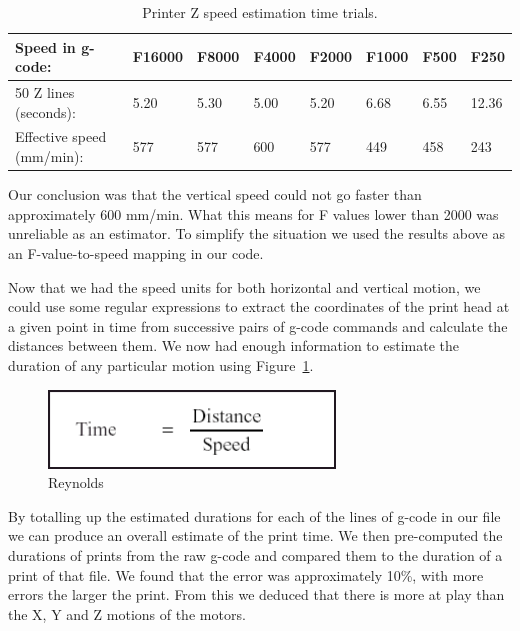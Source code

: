 \documentclass[pdftex, 11pt]{report} %
\begin{document}
\begin{table}[h]{\begin{minipage}{\textwidth}
\begin{tabular}{| l || l | l | l | l | l | l | l |}
\hline
Speed in g-code: & F16000 & F8000 & F4000 & F2000 & F1000 & F500 & F250 \\\hline
50 Z lines (seconds): & 5.20 & 5.30 & 5.00 & 5.20 & 6.68 & 6.55 & 12.36 \\\hline
Effective speed (mm/min): & 577 & 577 & 600 & 577 & 449 & 458 & 243 \\\hline

\end{tabular}
\caption{Printer Z speed estimation time trials.}
\label{table:speedTimes}
\end{minipage} }
\end{table}

Our conclusion was that the vertical speed could not go faster than approximately 600 mm/min. What this means for F values lower than 2000 was unreliable as an estimator. To simplify the situation we used the results above as an F-value-to-speed mapping in our code.

Now that we had the speed units for both horizontal and vertical motion, we could use some regular expressions to extract the coordinates of the print head at a given point in time from successive pairs of g-code commands and calculate the distances between them. We now had enough information to estimate the duration of any particular motion using Figure~\ref{figure:TDS}.

\begin{figure}[H]
  \centering
  \includegraphics[width=3in]{TDS.png}
  \caption{Reynolds~\cite{Reynolds2008}}
  \label{figure:TDS}
\end{figure}

By totalling up the estimated durations for each of the lines of g-code in our file we can produce an overall estimate of the print time. We then pre-computed the durations of prints from the raw g-code and compared them to the duration of a print of that file. We found that the error was approximately 10\%, with more errors the larger the print. From this we deduced that there is more at play than the X, Y and Z motions of the motors.
\end{document}
